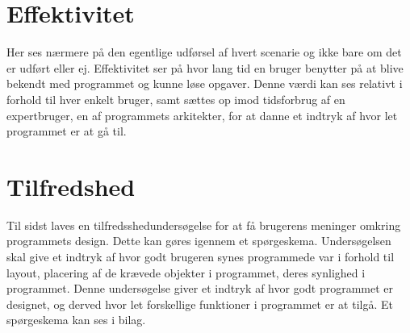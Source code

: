 \section{Effektivitet}
Her ses nærmere på den egentlige udførsel af hvert scenarie og ikke bare om det er udført eller ej. Effektivitet ser på hvor lang tid en bruger benytter på at blive bekendt med programmet og kunne løse opgaver. Denne værdi kan ses relativt i forhold til hver enkelt bruger, samt sættes op imod tidsforbrug af en expertbruger, en af programmets arkitekter, for at danne et indtryk af hvor let programmet er at gå til.
\section{Tilfredshed}
Til sidst laves en tilfredsshedundersøgelse for at få brugerens meninger omkring programmets design. Dette kan gøres igennem et spørgeskema. Undersøgelsen skal give et indtryk af hvor godt brugeren synes programmede var i forhold til layout, placering af de krævede objekter i programmet, deres synlighed i programmet. Denne undersøgelse giver et indtryk af hvor godt programmet er designet, og derved hvor let forskellige funktioner i programmet er at tilgå. Et spørgeskema kan ses i bilag. 